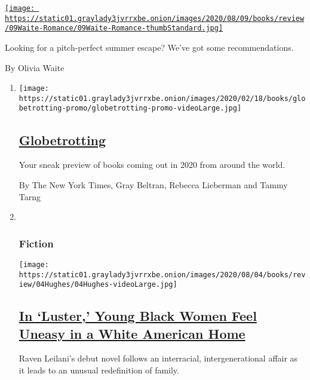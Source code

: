 \begin{enumerate}
\begin{enumerate}
    \href{/2020/08/07/books/review/summer-romance-novels-vanessa-riley.html}{\texttt{[image: https://static01.graylady3jvrrxbe.onion/images/2020/08/09/books/review/09Waite-Romance/09Waite-Romance-thumbStandard.jpg]}}

    Looking for a pitch-perfect summer escape? We've got some
    recommendations.

    By Olivia Waite
  \end{enumerate}
\end{enumerate}

\begin{enumerate}
\def\labelenumi{\arabic{enumi}.}
\item
  \texttt{[image: https://static01.graylady3jvrrxbe.onion/images/2020/02/18/books/globetrotting-promo/globetrotting-promo-videoLarge.jpg]}

  \hypertarget{globetrotting}{%
  \subsection{\texorpdfstring{\href{/interactive/2020/01/08/books/new-books-international.html}{Globetrotting}}{Globetrotting}}\label{globetrotting}}

  Your sneak preview of books coming out in 2020 from around the world.

  By The New York Times, Gray Beltran, Rebecca Lieberman and Tammy Tarng
\item ~
  \hypertarget{fiction-1}{%
  \subsubsection{Fiction}\label{fiction-1}}

  \texttt{[image: https://static01.graylady3jvrrxbe.onion/images/2020/08/04/books/review/04Hughes/04Hughes-videoLarge.jpg]}

  \hypertarget{in-luster-young-black-women-feel-uneasy-in-a-white-american-home}{%
  \subsection{\texorpdfstring{\href{/2020/08/06/books/review/raven-leilani-luster.html}{In
  `Luster,' Young Black Women Feel Uneasy in a White American
  Home}}{In `Luster,' Young Black Women Feel Uneasy in a White American Home}}\label{in-luster-young-black-women-feel-uneasy-in-a-white-american-home}}

  Raven Leilani's debut novel follows an interracial, intergenerational
  affair as it leads to an unusual redefinition of family.


\end{enumerate}
